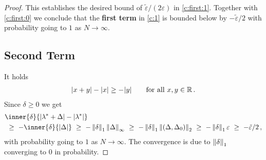 \begin{proof}
This establishes the desired bound of 
$
\tilde{\varepsilon}/(2\varepsilon)
$
in \eqref{c:first:1}.
Together with \eqref{c:first:0}
we conclude that the \textbf{first term} 
in
\eqref{c:1}
is bounded below by
$
-
\tilde{\varepsilon}/2
$
with probability going to $1$ as $N\to\infty$.
\subsection*{Second Term}
It holds
\begin{gather*}
  |x+y|-|x|\ge
  -|y|
  \qquad
  \text{for all}\ 
  x,y\in\R
  \,.
\end{gather*}
Since
$\delta\ge 0$
we get
\begin{align*}
  &
     \inner
     {\delta}
     {
       |\lambda^*+\Delta|
       -
       |\lambda^*|
     }
     \\
     &
     \ 
     \ge
     \ 
     -
     \inner{\delta}
     {|\Delta|}
     \ 
     \ge
     \ 
     -
     \norm{\delta}_1
     \norm{\Delta}_\infty
     \ 
     \ge
     \ 
     -
     \norm{\delta}_1
     \norm{(\Delta,\Delta_0)}_2
     \ 
     \ge
     \ 
     -
     \norm{\delta}_1
     \varepsilon
     \ 
     \ge
     \ 
     -
     \tilde{\varepsilon}/2
     \,,
\end{align*}
with probability going to $1$ as $N\to \infty$.
The convergence is due to $\left\lVert\delta\right\rVert_1$ converging to $0$ in probability.

\end{proof}
